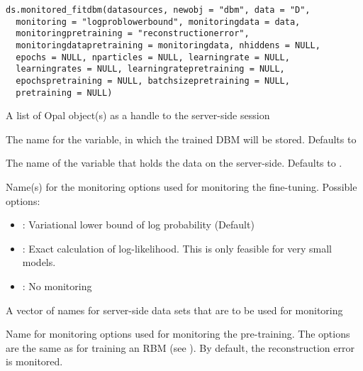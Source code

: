 %
\begin{Usage}
\begin{verbatim}
ds.monitored_fitdbm(datasources, newobj = "dbm", data = "D",
  monitoring = "logproblowerbound", monitoringdata = data,
  monitoringpretraining = "reconstructionerror",
  monitoringdatapretraining = monitoringdata, nhiddens = NULL,
  epochs = NULL, nparticles = NULL, learningrate = NULL,
  learningrates = NULL, learningratepretraining = NULL,
  epochspretraining = NULL, batchsizepretraining = NULL,
  pretraining = NULL)
\end{verbatim}
\end{Usage}
%
\begin{Arguments}
\begin{ldescription}
\item[\code{datasources}] A list of Opal object(s) as a handle to the server-side session

\item[\code{newobj}] The name for the variable, in which the trained DBM will be stored.
Defaults to 

\item[\code{data}] The name of the variable that holds the data on the server-side.
Defaults to .

\item[\code{monitoring}] Name(s) for the monitoring options used for monitoring the fine-tuning.
Possible options:
\begin{itemize}

\item {}: Variational lower bound of log probability (Default)
\item {}: Exact calculation of log-likelihood.
This is only feasible for very small models.
\item {}: No monitoring

\end{itemize}


\item[\code{monitoringdata}] A vector of names for server-side data sets that are to be used for
monitoring

\item[\code{monitoringpretraining}] Name for monitoring options used for monitoring the pre-training.
The options are the same as for
training an RBM (see ).
By default, the reconstruction error is monitored.


\end{ldescription}
\end{Arguments}
